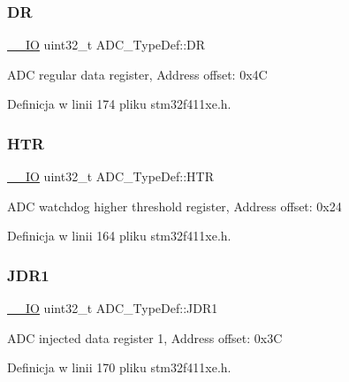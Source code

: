\subsubsection{\texorpdfstring{DR}{DR}}
{\footnotesize\ttfamily \hyperlink{core__sc300_8h_aec43007d9998a0a0e01faede4133d6be}{\+\_\+\+\_\+\+IO} uint32\+\_\+t A\+D\+C\+\_\+\+Type\+Def\+::\+DR}

A\+DC regular data register, Address offset\+: 0x4C 

Definicja w linii 174 pliku stm32f411xe.\+h.

\mbox{\label{struct_a_d_c___type_def_a297ac2d83a1837bfdc0333474b977de0}} 
\subsubsection{\texorpdfstring{H\+TR}{HTR}}
{\footnotesize\ttfamily \hyperlink{core__sc300_8h_aec43007d9998a0a0e01faede4133d6be}{\+\_\+\+\_\+\+IO} uint32\+\_\+t A\+D\+C\+\_\+\+Type\+Def\+::\+H\+TR}

A\+DC watchdog higher threshold register, Address offset\+: 0x24 

Definicja w linii 164 pliku stm32f411xe.\+h.

\mbox{\label{struct_a_d_c___type_def_ab4b0a79a9e4a9d5b0a24d7285cf55bdc}} 
\subsubsection{\texorpdfstring{J\+D\+R1}{JDR1}}
{\footnotesize\ttfamily \hyperlink{core__sc300_8h_aec43007d9998a0a0e01faede4133d6be}{\+\_\+\+\_\+\+IO} uint32\+\_\+t A\+D\+C\+\_\+\+Type\+Def\+::\+J\+D\+R1}

A\+DC injected data register 1, Address offset\+: 0x3C 

Definicja w linii 170 pliku stm32f411xe.\+h.

\mbox{\label{struct_a_d_c___type_def_a898b87cab4f099bcca981cc4c9318b51}} 
